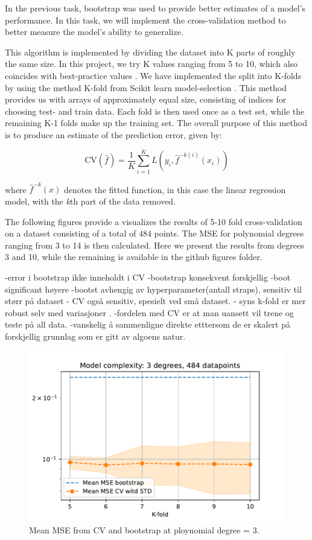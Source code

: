 \documentclass[11pt, a4paper]{article}
\begin{document}
In the previous task, bootstrap was used to provide better estimates of a model's performance.  In this task, we will implement the cross-validation method to better measure the model's ability to generalize. 

This algorithm is implemented by dividing the dataset into K parts of roughly the same size. In this project, we try K values ranging from 5 to 10, which also coincides with best-practice values \cite{Hastie2009}.  We have implemented the split into K-folds by using the method K-fold from Scikit learn model-selection \cite{link_to_doc}. This method provides us with arrays of approximately equal size, consisting of indices for choosing test- and train data.  Each fold is then used once as a test set, while the remaining K-1 folds make up the training set. The overall purpose of this method is to produce an estimate of the prediction error, given by:

\[
  \text{CV}(\hat{f}) = \frac{1}{K}
  \sum_{i=1}^{K}L(y_i,\hat{f}^{-k(i)}(x_i))
\]

where $\hat{f}^{-k}(x)$ denotes the fitted function, in this case the linear regression model, with the \emph{k}th part of the data removed.\cite{Hastie2009}  

The following figures provide a visualizes the results of 5-10 fold cross-validation on a dataset consisting of a total of $484$ points. The MSE for polynomial degrees ranging from 3 to 14 is then calculated. Here we present the results from degrees 3 and 10, while the remaining is available in the github figures folder. 

-error i bootstrap ikke inneholdt i CV
-bootstrap konsekvent forskjellig 
-boot significant høyere
-bootst avhengig av hyperparameter(antall straps), sensitiv til størr på dataset
- CV også sensitiv, spesielt ved små dataset. 
- syns k-fold er mer robust selv med variasjoner . 
-fordelen med CV er at man uansett vil trene og teste på all data. 
-vanskelig å sammenligne direkte etttersom de er skalert på forskjellig grunnlag som er gitt av algoens natur. 

\begin{figure}[h]
  \centering
  \includegraphics[scale=0.75]{figures/EX3_mse_cv_boot3.pdf}
  \caption{\label{fig:?} Mean MSE from CV and bootstrap at ploynomial degree = 3.}
\end{figure}
\end{document}
